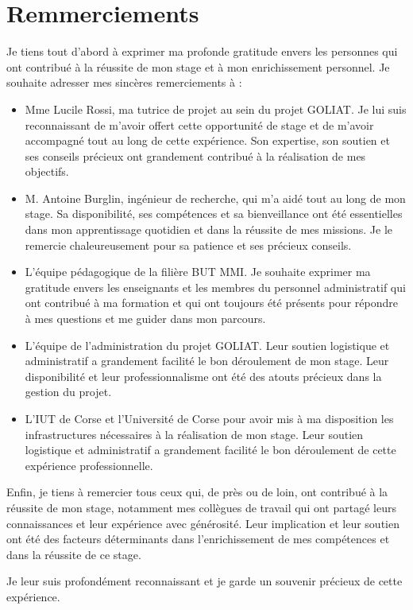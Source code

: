 \chapter*{Remmerciements}

Je tiens tout d'abord à exprimer ma profonde gratitude envers les personnes qui ont contribué à la réussite de mon stage et à mon enrichissement personnel. Je souhaite adresser mes sincères remerciements à :

\begin{itemize}

\item Mme Lucile Rossi, ma tutrice de projet au sein du projet GOLIAT. Je lui suis reconnaissant de m'avoir offert cette opportunité de stage et de m'avoir accompagné tout au long de cette expérience. Son expertise, son soutien et ses conseils précieux ont grandement contribué à la réalisation de mes objectifs.

\item M. Antoine Burglin, ingénieur de recherche, qui m'a aidé tout au long de mon stage. Sa disponibilité, ses compétences et sa bienveillance ont été essentielles dans mon apprentissage quotidien et dans la réussite de mes missions. Je le remercie chaleureusement pour sa patience et ses précieux conseils.

\item L'équipe pédagogique de la filière BUT MMI. Je souhaite exprimer ma gratitude envers les enseignants et les membres du personnel administratif qui ont contribué à ma formation et qui ont toujours été présents pour répondre à mes questions et me guider dans mon parcours.

\item L'équipe de l'administration du projet GOLIAT. Leur soutien logistique et administratif a grandement facilité le bon déroulement de mon stage. Leur disponibilité et leur professionnalisme ont été des atouts précieux dans la gestion du projet.

\item L'IUT de Corse et l'Université de Corse pour avoir mis à ma disposition les infrastructures nécessaires à la réalisation de mon stage. Leur soutien logistique et administratif a grandement facilité le bon déroulement de cette expérience professionnelle.
\end{itemize}

Enfin, je tiens à remercier tous ceux qui, de près ou de loin, ont contribué à la réussite de mon stage, notamment mes collègues de travail qui ont partagé leurs connaissances et leur expérience avec générosité. Leur implication et leur soutien ont été des facteurs déterminants dans l'enrichissement de mes compétences et dans la réussite de ce stage.

Je leur suis profondément reconnaissant et je garde un souvenir précieux de cette expérience.